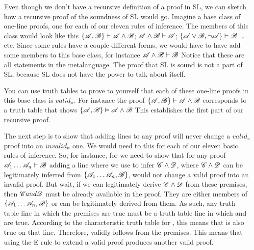 Even though we don't have a recursive definition of a proof in SL, we can sketch how a recursive proof of the soundness of SL would go. Imagine a base class of one-line proofs, one for each of our eleven rules of inference. The members of this class would look like this $\{\mathscr{A}, \mathscr{B}\} \vdash  \mathscr{A} \wedge \mathscr{B}$; $\mathscr{A} \wedge \mathscr{B} \vdash \mathscr{A}$; $\{\mathscr{A} \vee \mathscr{B}, \neg\mathscr{A}\} \vdash  \mathscr{B}$ \ldots{} etc. Since some rules have a couple different forms, we would have to have add some members to this base class, for instance $\mathscr{A} \wedge \mathscr{B} \vdash  \mathscr{B}$ Notice that these are all statements in the metalanguage. The proof that SL is sound is not a part of SL, because SL does not have the power to talk about itself. 

You can use truth tables to prove to yourself that each of these one-line proofs in this base class is $valid_{\models}$. For instance the proof $\{\mathscr{A}, \mathscr{B}\} \vdash  \mathscr{A} \wedge \mathscr{B}$ corresponds to a truth table that shows $\{\mathscr{A}, \mathscr{B}\} \vDash  \mathscr{A} \wedge \mathscr{B}$ This establishes the first part of our recursive proof. 

The next step is to show that adding lines to any proof will never change a $valid_{\models}$ proof into an $invalid_{\models}$ one. We would need to this for each of our eleven basic rules of inference. So, for instance, for  we need to show that for any proof $\mathscr{A}_{1} \ldots{} \mathscr{A}_{n} \vdash  \mathscr{B}$ adding a line where we use  to infer $\mathscr{C} \wedge \mathscr{D}$, where $\mathscr{C} \wedge \mathscr{D}$ can be legitimately inferred from $\{\mathscr{A}_{1} \ldots{} \mathscr{A}_{n}, \mathscr{B}\}$, would not change a valid proof into an invalid proof. But wait, if we can legitimately derive $\mathscr{C} \wedge \mathscr{D}$ from these premises, then $\mathscr{C} and \mathscr{D}$ must be already available in the proof. They are either members of  $\{\mathscr{A}_{1} \ldots{} \mathscr{A}_{n}, \mathscr{B}\}$ or can be legitimately derived from them. As such, any truth table line in which the premises are true must be a truth table line in which  and  are true. According to the characteristic truth table for \eand, this means that \eand{} is also true on that line. Therefore, \eand{} validly follows from the premises. This means that using the {\eand}E rule to extend a valid proof produces another valid proof.

